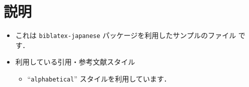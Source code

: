 \documentclass[10pt]{jlreq}
\begin{document}
\section{説明}

\begin{itemize}
 \item これは \texttt{biblatex-japanese} パッケージを利用したサンプルのファイル
       です．
 \item 利用している引用・参考文献スタイル
       \begin{itemize}
        \item ``\texttt{alphabetical}'' スタイルを利用しています．
       \end{itemize}
\end{itemize}


\end{document}
